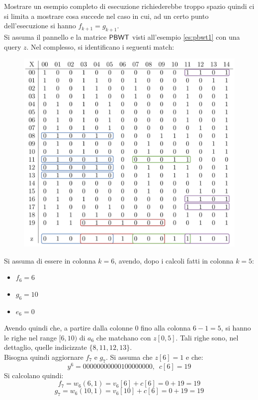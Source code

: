\begin{esempio}
  \label{es:algo5}
  Mostrare un esempio completo di esecuzione richiederebbe troppo spazio quindi
  ci si limita a mostrare cosa succede nel caso in cui, ad un certo punto
  dell'esecuzione si hanno $f_{k+1}=g_{k+1}$.\\
  Si assuma il pannello e la  matrice $\mbox{\rm {\sf PBWT}}$ visti all'esempio
  \ref{es:pbwt1} con una query $z$. Nel complesso, si identificano i
  seguenti match:
  \begin{figure}[H]
    \centering
    \includegraphics[scale = 0.365]{img/pbwtmatch.pdf}
  \end{figure}
  Si assuma di essere in colonna $k=6$, avendo, dopo i calcoli fatti in colonna
  $k=5$: 
  \begin{itemize}
    \item $f_6=6$
    \item $g_6=10$
    \item $e_6=0$
  \end{itemize}
  Avendo quindi che, a partire dalla colonne $0$ fino alla colonna $6-1=5$, si
  hanno le righe nel range $[6,10)$ di $a_{6}$ che matchano con $z[0,5]$. Tali
  righe sono, nel dettaglio, quelle indicizzate $\{8, 11, 12, 13\}$.\\
  Bisogna quindi aggiornare $f_7$ e $g_7$. Si assuma che $z[6]=1$ e che:
  \[y^6=00000000000100000000,\,\,\,c[6]=19\]
  Si calcolano quindi:
  \[f_7=w_6(6,1)=v_6[6]+c[6]=0+19=19\]
  \[g_7=w_6(10,1)=v_6[10]+c[6]=0+19=19\]

\end{esempio}

